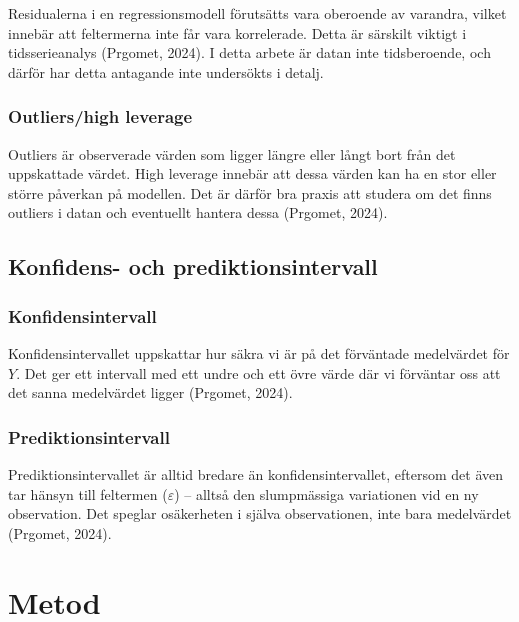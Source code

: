 \documentclass[
  letterpaper,
  DIV=11,
  numbers=noendperiod]{scrreprt}
\begin{document}
Residualerna i en regressionsmodell förutsätts vara oberoende av
varandra, vilket innebär att feltermerna inte får vara korrelerade.
Detta är särskilt viktigt i tidsserieanalys (Prgomet, 2024). I detta
arbete är datan inte tidsberoende, och därför har detta antagande inte
undersökts i detalj.

\subsection{Outliers/high leverage}\label{outliershigh-leverage}

Outliers är observerade värden som ligger längre eller långt bort från
det uppskattade värdet. High leverage innebär att dessa värden kan ha en
stor eller större påverkan på modellen. Det är därför bra praxis att
studera om det finns outliers i datan och eventuellt hantera dessa
(Prgomet, 2024).

\section{Konfidens- och
prediktionsintervall}\label{konfidens--och-prediktionsintervall}

\subsection{Konfidensintervall}\label{konfidensintervall}

Konfidensintervallet uppskattar hur säkra vi är på det förväntade
medelvärdet för \(Y\). Det ger ett intervall med ett undre och ett övre
värde där vi förväntar oss att det sanna medelvärdet ligger (Prgomet,
2024).

\subsection{Prediktionsintervall}\label{prediktionsintervall}

Prediktionsintervallet är alltid bredare än konfidensintervallet,
eftersom det även tar hänsyn till feltermen (\(\varepsilon\)) -- alltså
den slumpmässiga variationen vid en ny observation. Det speglar
osäkerheten i själva observationen, inte bara medelvärdet (Prgomet,
2024).


\chapter{Metod}\label{metod}
\end{document}
